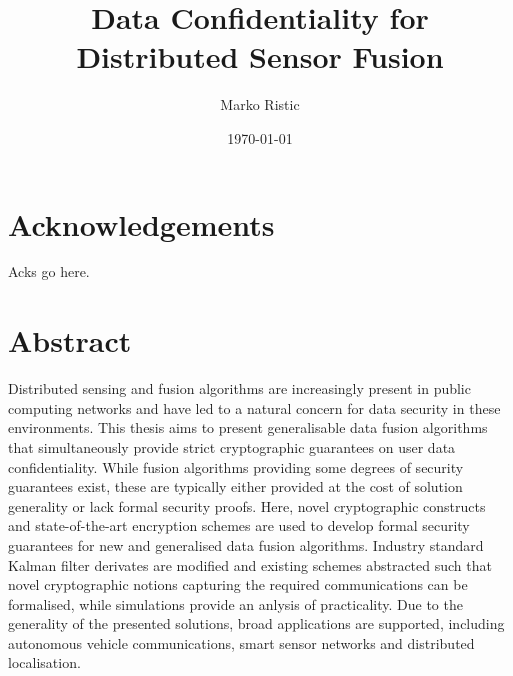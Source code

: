 \documentclass[oneside]{scrbook}
\title{Data Confidentiality for Distributed Sensor Fusion}
\author{Marko Ristic}
\date{\today}
\theoremstyle{definition}
\theoremstyle{definition}
\theoremstyle{remark}
\begin{document}
\maketitle

\frontmatter
\tableofcontents

% 
%                                     
%                                     
%                                     
% 
\chapter{Acknowledgements}
Acks go here.

% 
%                                                                
%                                                                
%                                                                
% 
\chapter{Abstract}
Distributed sensing and fusion algorithms are increasingly present in public computing networks and have led to a natural concern for data security in these environments. This thesis aims to present generalisable data fusion algorithms that simultaneously provide strict cryptographic guarantees on user data confidentiality. While fusion algorithms providing some degrees of security guarantees exist, these are typically either provided at the cost of solution generality or lack formal security proofs. Here, novel cryptographic constructs and state-of-the-art encryption schemes are used to develop formal security guarantees for new and generalised data fusion algorithms. Industry standard Kalman filter derivates are modified and existing schemes abstracted such that novel cryptographic notions capturing the required communications can be formalised, while simulations provide an anlysis of practicality. Due to the generality of the presented solutions, broad applications are supported, including autonomous vehicle communications, smart sensor networks and distributed localisation.
\end{document}
